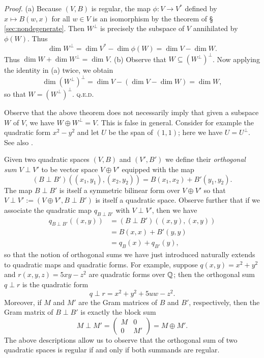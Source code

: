 \emph{Proof.} (a) Because \((V, B)\) is regular, the map \(\phi: V \to V^*\)
defined by \(x \mapsto B(w, x)\) for all \(w \in V\) is an isomorphism by the
theorem of \S\,\ref{sec:nondegenerate}. Then \(W^{\perp}\) is precisely the
subspace of \(V\) annihilated by \(\phi(W)\). Thus
\[
    \dim W^{\perp} = \dim V^* - \dim \phi(W) = \dim V - \dim W.
\]
Thus \(\dim W + \dim W^{\perp} = \dim V\). (b) Observe that \(W \subseteq
(W^{\perp})^{\perp}\). Now applying the identity in (a) twice, we obtain
\[
  \dim (W^{\perp})^{\perp} = \dim V - (\dim V - \dim W) = \dim W,
\]
so that \(W = (W^{\perp})^{\perp}\). {\scshape q.e.d.}

Observe that the above theorem does not necessarily imply that given a subspace
\(W\) of \(V\), we have \(W \oplus W^{\perp} = V\). This is false in general.
Consider for example the quadratic form \(x^2 - y^2\) and let \(U\) be the span
of \((1, 1)\); here we have \(U = U^{\perp}\). See also \cite{ormsbynotes}.

Given two quadratic spaces \((V, B)\) and \((V', B')\) we define their
\emph{orthogonal sum} \(V \perp V'\) to be vector space \(V \oplus V'\) equipped
with the map\label{sec:orthogonal-sum}
\[ 
  (B \perp B')((x_1, y_1), (x_2, y_2)) = B(x_1, x_2) + B'(y_1, y_2).
\]
The map \(B \perp B'\) is itself a symmetric bilinear form over \(V \oplus V'\)
so that \(V \perp V' := (V \oplus V', B \perp B')\) is itself a quadratic space.
Observe further that if we associate the quadratic map \(q_{B \perp B'}\) with
\(V \perp V'\), then we have
\begin{align*}
  q_{B \perp B'}((x, y)) &= (B \perp B')((x, y), (x, y))\\
  &= B(x, x) + B'(y, y)\\
  &= q_B(x) + q_{B'}(y),
\end{align*}
so that the notion of orthogonal sums we have just introduced naturally extends
to quadratic maps and quadratic forms. For example, suppose \(q(x, y) = x^2 +
y^2\) and \(r(x, y, z) = 5xy - z^2\) are quadratic forms over \(\mathbb{Q}\);
then the orthogonal sum \(q \perp r\) is the quadratic form
\[
  q \perp r = x^2 + y^2 + 5uw - z^2.
\]
Moreover, if \(M\) and \(M'\) are the Gram matrices of \(B\) and \(B'\),
respectively, then the Gram matrix of \(B \perp B'\) is exactly the block sum
\begin{equation}\label{eq:orthogonal-sum-as-block-sum}
  M \perp M' =
  \begin{pmatrix}
    M & 0 \\
    0 & M'
  \end{pmatrix}
  = M \oplus M'.
\end{equation}
The above descriptions allow us to observe that the orthogonal sum of two
quadratic spaces is regular if and only if both summands are regular.

